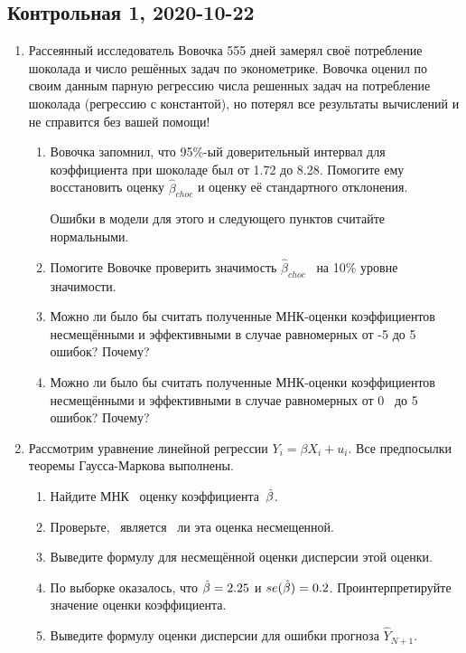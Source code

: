 
\subsection{Контрольная 1, 2020-10-22}


\begin{enumerate}


\item Рассеянный исследователь Вовочка 555 дней замерял своё потребление шоколада 
и число решённых задач по эконометрике. 
Вовочка оценил по своим данным парную регрессию числа решенных задач на потребление шоколада 
(регрессию с константой), но потерял все результаты вычислений и не справится без вашей помощи!

\begin{enumerate}
    \item Вовочка запомнил, что 95\%-ый доверительный интервал для коэффициента 
    при шоколаде был от 1.72 до 8.28. Помогите ему восстановить оценку $\hat\beta_{choc}$  и оценку её стандартного отклонения. 

    Ошибки в модели для этого и следующего пунктов считайте нормальными.
\item Помогите Вовочке проверить значимость  $\hat\beta_{choc}$  на 10\% уровне значимости.
\item Можно ли было бы считать полученные МНК-оценки коэффициентов несмещёнными и эффективными 
в случае равномерных от -5 до 5 ошибок? Почему?
\item Можно ли было бы считать полученные МНК-оценки коэффициентов несмещёнными и эффективными 
в случае равномерных от 0  до 5 ошибок? Почему?
\end{enumerate}


\item Рассмотрим уравнение линейной регрессии $Y_i = \beta X_i + u_i$. 
Все предпосылки теоремы Гаусса-Маркова выполнены.
\begin{enumerate}
\item Найдите МНК  оценку коэффициента $\hat{\beta}$.
\item Проверьте,  является  ли эта оценка несмещенной.
\item Выведите формулу для несмещённой оценки дисперсии этой оценки. 
\item По выборке оказалось, что $\hat{\beta} = 2.25$ и $se(\hat{\beta})=0.2$. 
Проинтерпретируйте значение оценки коэффициента.
\item Выведите формулу оценки дисперсии для ошибки прогноза $\hat Y_{N+1}$.
\end{enumerate}


\end{enumerate}
